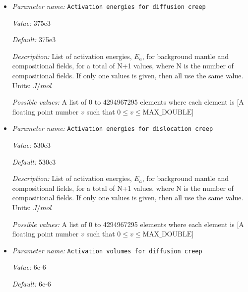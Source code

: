 \begin{itemize}
\item {\it Parameter name:} {\tt Activation energies for diffusion creep}
\label{parameters:Material model/Diffusion dislocation/Activation energies for diffusion creep}


{\it Value:} 375e3


{\it Default:} 375e3


{\it Description:} List of activation energies, $E_a$, for background mantle and compositional fields, for a total of N+1 values, where N is the number of compositional fields. If only one values is given, then all use the same value.  Units: $J / mol$


{\it Possible values:} A list of 0 to 4294967295 elements where each element is [A floating point number $v$ such that $0 \leq v \leq \text{MAX\_DOUBLE}$]
\item {\it Parameter name:} {\tt Activation energies for dislocation creep}
\label{parameters:Material model/Diffusion dislocation/Activation energies for dislocation creep}


{\it Value:} 530e3


{\it Default:} 530e3


{\it Description:} List of activation energies, $E_a$, for background mantle and compositional fields, for a total of N+1 values, where N is the number of compositional fields. If only one values is given, then all use the same value.  Units: $J / mol$


{\it Possible values:} A list of 0 to 4294967295 elements where each element is [A floating point number $v$ such that $0 \leq v \leq \text{MAX\_DOUBLE}$]
\item {\it Parameter name:} {\tt Activation volumes for diffusion creep}
\label{parameters:Material model/Diffusion dislocation/Activation volumes for diffusion creep}


{\it Value:} 6e-6


{\it Default:} 6e-6



\end{itemize}
